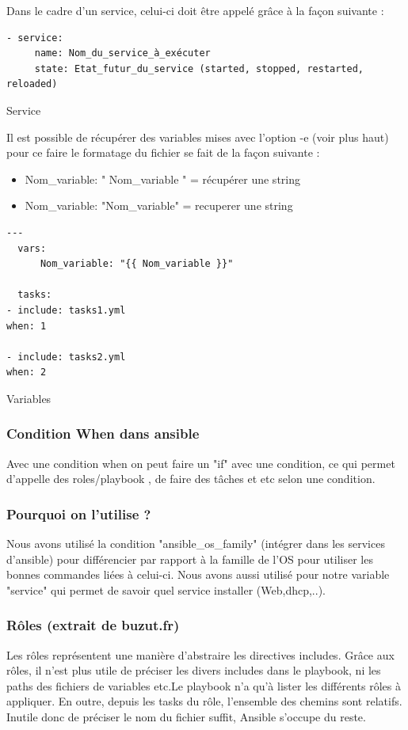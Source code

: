 \documentclass[a4paper, 12pt]{article}
\newenvironment{code}{\captionsetup{type=listing}}{}
\begin{document}
Dans le cadre d'un service, celui-ci doit être appelé grâce à la façon suivante :
\begin{code}
    \begin{verbatim}
- service:
     name: Nom_du_service_à_exécuter
     state: Etat_futur_du_service (started, stopped, restarted, reloaded)
    \end{verbatim}
    \caption{Service}
    \label{Service}
\end{code}
\bigbreak
\bigbreak
Il est possible de récupérer des variables mises avec l'option -e (voir plus haut) pour ce faire le formatage du fichier se fait de la façon suivante :
\begin{itemize}
    \item Nom\_variable: "{{ Nom\_variable }}" = récupérer une string
    \item Nom\_variable: "Nom\_variable" = recuperer une string
\end{itemize}
\begin{code}
    \begin{verbatim}
---
  vars:
      Nom_variable: "{{ Nom_variable }}"

  tasks:
- include: tasks1.yml
when: 1

- include: tasks2.yml
when: 2
    \end{verbatim}
    \caption{Variables}
    \label{Variables}
\end{code}
\bigbreak

\subsubsection{Condition When dans ansible}
Avec une condition when on peut faire un "if" avec une condition, ce qui permet d'appelle des roles/playbook ,
de faire des tâches et etc selon une condition.

\subsubsection{Pourquoi on l'utilise ?}
Nous avons utilisé la condition "ansible\_os\_family" (intégrer dans les services d'ansible) pour différencier par
rapport à la famille de l'OS pour utiliser les bonnes commandes liées à celui-ci. Nous avons aussi utilisé pour
notre variable "service" qui permet de savoir quel service installer (Web,dhcp,..).

\subsubsection{Rôles (extrait de buzut.fr)}
Les rôles représentent une manière d'abstraire les directives includes. Grâce aux rôles, il n'est plus utile de
préciser les divers includes dans le playbook, ni les paths des fichiers de variables etc.​	Le playbook n'a qu'à
lister les différents rôles à appliquer. En outre, depuis les tasks du rôle, l'ensemble des chemins sont relatifs.
Inutile donc de préciser le nom du fichier suffit, Ansible s'occupe du reste.
\end{document}
